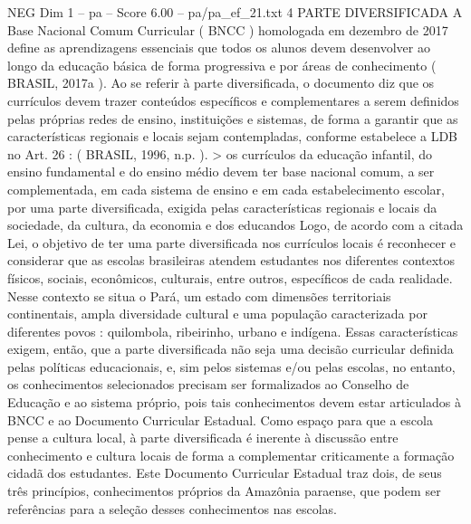 \begin{textsample}{NEG Dim 1 – pa – Score 6.00 – pa/pa\_ef\_21.txt}  \label{ex:f1_neg_257}
4 PARTE DIVERSIFICADA A Base Nacional Comum Curricular ( BNCC ) homologada em dezembro de 2017 define as aprendizagens essenciais que todos os alunos devem desenvolver ao longo da educação básica de forma progressiva e por áreas de conhecimento ( BRASIL, 2017a ).
Ao se referir à parte diversificada, o documento diz que os currículos devem trazer conteúdos específicos e complementares a serem definidos pelas próprias redes de ensino, instituições e sistemas, de forma a garantir que as características regionais e locais sejam contempladas, conforme estabelece a LDB no Art. 26 : ( BRASIL, 1996, n.p. ). > os currículos da educação infantil, do ensino fundamental e do ensino médio devem ter base nacional comum, a ser complementada, em cada sistema de ensino e em cada estabelecimento escolar, por uma parte diversificada, exigida pelas características regionais e locais da sociedade, da cultura, da economia e dos educandos Logo, de acordo com a citada Lei, o objetivo de ter uma parte diversificada nos currículos locais é reconhecer e considerar que as escolas brasileiras atendem estudantes nos diferentes contextos físicos, sociais, econômicos, culturais, entre outros, específicos de cada realidade.
Nesse contexto se situa o Pará, um estado com dimensões territoriais continentais, ampla diversidade cultural e uma população caracterizada por diferentes povos : quilombola, ribeirinho, urbano e indígena.
Essas características exigem, então, que a parte diversificada não seja uma decisão curricular definida pelas políticas educacionais, e, sim pelos sistemas e/ou pelas escolas, no entanto, os conhecimentos selecionados precisam ser formalizados ao Conselho de Educação e ao sistema próprio, pois tais conhecimentos devem estar articulados à BNCC e ao Documento Curricular Estadual.
Como espaço para que a escola pense a cultura local, à parte diversificada é inerente à discussão entre conhecimento e cultura locais de forma a complementar criticamente a formação cidadã dos estudantes.
Este Documento Curricular Estadual traz dois, de seus três princípios, conhecimentos próprios da Amazônia paraense, que podem ser referências para a seleção desses conhecimentos nas escolas.

\end{textsample}
